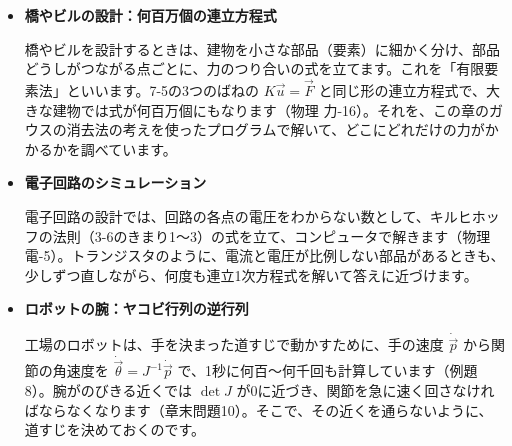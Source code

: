 \begin{butsuri}
\begin{itemize}[leftmargin=1.2\zw, itemsep=3pt, topsep=0pt, label={\color{bkPurple}●}]
\item \textbf{橋やビルの設計：何百万個の連立方程式}\par\noindent\begin{minipage}[c]{0.70\linewidth}
橋やビルを設計するときは、建物を小さな部品（要素）に細かく分け、部品どうしがつながる点ごとに、力のつり合いの式を立てます。これを「有限要素法」といいます。7-5の3つのばねの $K\vec u=\vec F$ と同じ形の連立方程式で、大きな建物では式が何百万個にもなります（物理 力-16）。それを、この章のガウスの消去法の考えを使ったプログラムで解いて、どこにどれだけの力がかかるかを調べています。
\end{minipage}\hfill
\begin{minipage}[c]{0.27\linewidth}\centering
{}
\end{minipage}
\item \textbf{電子回路のシミュレーション}\par\noindent 電子回路の設計では、回路の各点の電圧をわからない数として、キルヒホッフの法則（3-6のきまり1〜3）の式を立て、コンピュータで解きます（物理 電-5）。トランジスタのように、電流と電圧が比例しない部品があるときも、少しずつ直しながら、何度も連立1次方程式を解いて答えに近づけます。
\item \textbf{ロボットの腕：ヤコビ行列の逆行列}\par\noindent 工場のロボットは、手を決まった道すじで動かすために、手の速度 $\dot{\vec p}$ から関節の角速度を $\dot{\vec\theta}=J^{-1}\dot{\vec p}$ で、1秒に何百〜何千回も計算しています（例題8）。腕がのびきる近くでは $\det J$ が0に近づき、関節を急に速く回さなければならなくなります（章末問題10）。そこで、その近くを通らないように、道すじを決めておくのです。
\end{itemize}
\end{butsuri}

